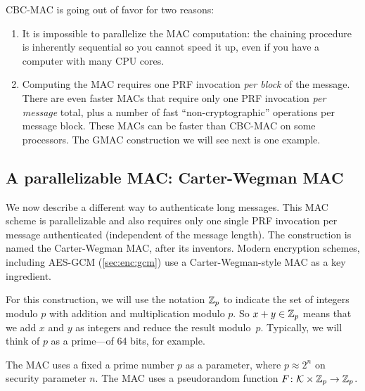 CBC-MAC is going out of favor for two reasons:
\begin{enumerate}
  \item It is impossible to parallelize the MAC computation:
        the chaining procedure is inherently sequential so you 
        cannot speed it up, even if you have a computer with many 
        CPU cores.
  \item Computing the MAC requires one PRF invocation \emph{per block} of the message.
        There are even faster MACs that require only one PRF invocation
        \emph{per message} total, 
        plus a number of fast ``non-cryptographic'' operations
        per message block.
        These MACs can be faster than CBC-MAC on some processors.
        The GMAC construction we will see next is one example.
\end{enumerate}


\subsection{A parallelizable MAC: Carter-Wegman MAC}\label{sec:mac:cw}

We now describe a different way to authenticate long messages.
This MAC scheme is parallelizable and also requires only one 
single PRF invocation per message authenticated (independent of
the message length).
The construction is named the Carter-Wegman MAC, after its
inventors.\autocite{CW81}
Modern encryption schemes, including AES-GCM (\cref{sec:enc:gcm})
use a Carter-Wegman-style MAC as a key ingredient.

For this construction, we will use the notation
$\mathbb{Z}_p$ to indicate the set of integers modulo $p$
with addition and multiplication modulo $p$.
So $x + y \in \mathbb{Z}_p$ means that we add $x$ and $y$
as integers and reduce the result modulo~$p$.
Typically, we will think of $p$ as a prime---of
64 bits, for example.

The MAC uses a fixed a prime number $p$ as a parameter,
where $p \approx 2^n$ on security parameter $n$.
The MAC uses a pseudorandom function 
$F \colon \mathcal{K} \times \mathbb{Z}_p \to \mathbb{Z}_p$.

